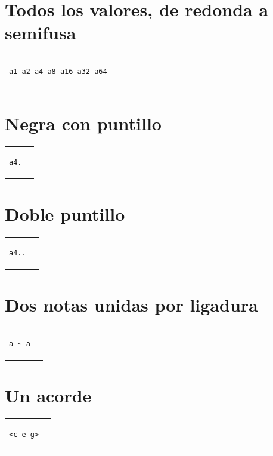 \documentclass[10pt,a4paper,oneside,headinclude,titlepage]{scrartcl}
\begin{document}
\section*{Todos los valores, de redonda a semifusa}
\begin{tabular}{m{6cm}m{2cm}}
\begin{verbatim}
a1 a2 a4 a8 a16 a32 a64
\end{verbatim}
&
\begin[fragment,relative=2,notime]{lilypond}
a1 a2 a4 a8 a16 a32 a64
\end{lilypond}
\end{tabular}

\section*{Negra con puntillo}
\begin{tabular}{m{2cm}m{2cm}}
\begin{verbatim}
a4.
\end{verbatim}
&
\begin[fragment,relative=2,notime]{lilypond}
a4.
\end{lilypond}
\end{tabular}

\section*{Doble puntillo}
\begin{tabular}{m{2cm}m{2cm}}
\begin{verbatim}
a4..
\end{verbatim}
&
\begin[fragment,relative=2,notime]{lilypond}
a4..
\end{lilypond}
\end{tabular}

\section*{Dos notas unidas por ligadura}
\begin{tabular}{m{2cm}m{2cm}}
\begin{verbatim}
a ~ a
\end{verbatim}
&
\begin[fragment,relative=2,notime]{lilypond}
a ~ a
\end{lilypond}
\end{tabular}

\section*{Un acorde}
\begin{tabular}{m{2cm}m{2cm}}
\begin{verbatim}
<c e g>
\end{verbatim}
&
\begin[fragment,relative=1,notime]{lilypond}
<c e g>
\end{lilypond}
\end{tabular}
\end{document}
